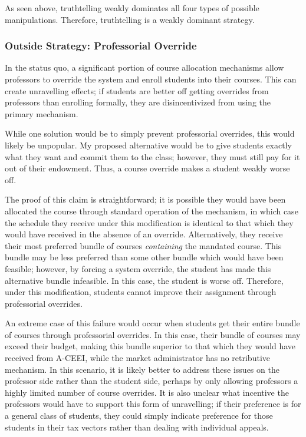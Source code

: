 \documentclass{article}
\begin{document}
As seen above, truthtelling weakly dominates all four types of possible manipulations. Therefore, truthtelling is a weakly dominant strategy. 

\subsubsection{Outside Strategy: Professorial Override}

In the status quo, a significant portion of course allocation mechanisms allow professors to override the system and enroll students into their courses. This can create unravelling effects; if students are better off getting overrides from professors than enrolling formally, they are disincentivized from using the primary mechanism. 

While one solution would be to simply prevent professorial overrides, this would likely be unpopular. My proposed alternative would be to give students exactly what they want and commit them to the class; however, they must still pay for it out of their endowment. Thus, a course override makes a student weakly worse off. 

The proof of this claim is straightforward; it is possible they would have been allocated the course through standard operation of the mechanism, in which case the schedule they receive under this modification is identical to that which they would have received in the absence of an override. Alternatively, they receive their most preferred bundle of courses \emph{containing} the mandated course. This bundle may be less preferred than some other bundle which would have been feasible; however, by forcing a system override, the student has made this alternative bundle infeasible. In this case, the student is worse off. Therefore, under this modification, students cannot improve their assignment through professorial overrides.

An extreme case of this failure would occur when students get their entire bundle of courses through professorial overrides. In this case, their bundle of courses may exceed their budget, making this bundle superior to that which they would have received from A-CEEI, while the market administrator has no retributive mechanism. In this scenario, it is likely better to address these issues on the professor side rather than the student side, perhaps by only allowing professors a highly limited number of course overrides. It is also unclear what incentive the professors would have to support this form of unravelling; if their preference is for a general class of students, they could simply indicate preference for those students in their tax vectors rather than dealing with individual appeals. 
\end{document}
